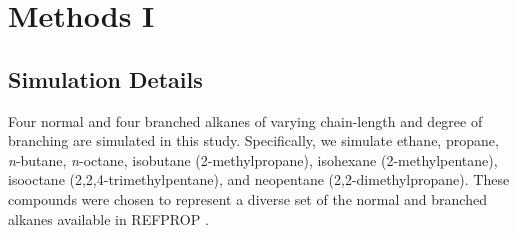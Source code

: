 \documentclass[preprint,letterpaper,floatfix,citeautoscript,aip,jcp]{revtex4-1}
\begin{document}

\section{Methods I} \label{Methods I}

\subsection{Simulation Details}
Four normal and four branched alkanes of varying chain-length and degree of branching are simulated in this study. Specifically, we simulate ethane, propane, \textit{n}-butane, \textit{n}-octane, isobutane (2-methylpropane), isohexane (2-methylpentane), isooctane (2,2,4-trimethylpentane), and neopentane (2,2-dimethylpropane). These compounds were chosen to represent a diverse set of the normal and branched alkanes available in REFPROP \cite{LEMMON-RP91}.
\end{document}
